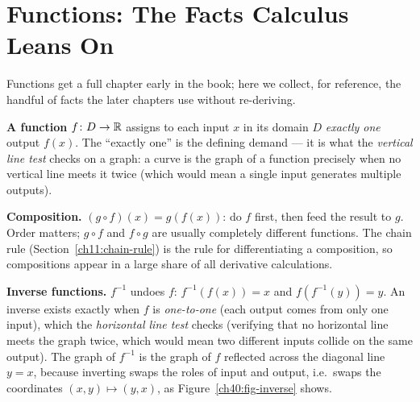 \section{Functions: The Facts Calculus Leans On}
\label{ch40:functions}

Functions get a full chapter early in the book; here we collect, for reference, the
handful of facts the later chapters use without re-deriving.

\textbf{A function} $f\colon D \to \mathbb{R}$ assigns to each input $x$ in its domain $D$
\emph{exactly one} output $f(x)$. The ``exactly one'' is the defining demand --- it
is what the \emph{vertical line test} checks on a graph: a curve is the graph of a
function precisely when no vertical line meets it twice (which would mean a single
input generates multiple outputs).

\textbf{Composition.} $(g\circ f)(x) = g(f(x))$: do $f$ first, then feed the result
to $g$. Order matters; $g\circ f$ and $f\circ g$ are usually completely different
functions. The chain rule (Section~\ref{ch11:chain-rule}) is the
rule for differentiating a composition, so compositions appear in a large share
of all derivative calculations.

\textbf{Inverse functions.} $f^{-1}$ undoes $f$: $f^{-1}(f(x)) = x$ and
$f(f^{-1}(y)) = y$. An inverse exists exactly when $f$ is \emph{one-to-one} (each
output comes from only one input), which the \emph{horizontal line test} checks
(verifying that no horizontal line meets the graph twice, which would mean two
different inputs collide on the same output). The graph of $f^{-1}$ is the graph
of $f$ reflected across the diagonal line $y=x$, because inverting swaps the roles
of input and output, i.e.\ swaps the coordinates $(x,y) \mapsto (y,x)$, as
Figure~\ref{ch40:fig-inverse} shows.


